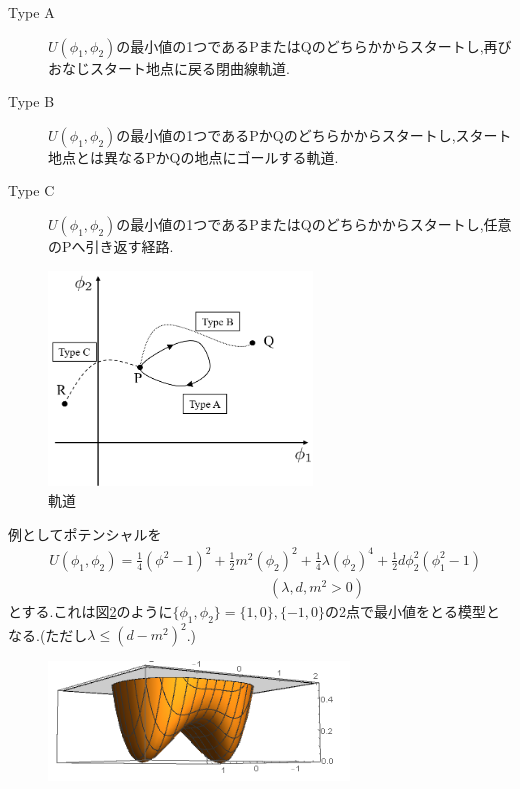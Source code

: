 \documentclass[dvipdfmx,11pt,a4paper,oneside,openany]{jsbook}
\begin{document}
\begin{description}
    \item[Type A] $U(\phi_1,\phi_2)$の最小値の1つであるPまたはQのどちらかからスタートし,再びおなじスタート地点に戻る閉曲線軌道.
    \item[Type B] $U(\phi_1,\phi_2)$の最小値の1つであるPかQのどちらかからスタートし,スタート地点とは異なるPかQの地点にゴールする軌道.
    \item[Type C] $U(\phi_1,\phi_2)$の最小値の1つであるPまたはQのどちらかからスタートし,任意のPへ引き返す経路.
\end{description}

\begin{figure}[H]
    \centering
    \includegraphics[width=7cm]{figure/orbit1.png}
    \caption{軌道}
    \label{orbit1}
\end{figure}

例としてポテンシャルを
\begin{align}
     & U\left(\phi_{1}, \phi_{2}\right)=\frac{1}{4}\left(\phi^{2}-1\right)^{2}+\frac{1}{2} m^{2}\left(\phi_{2}\right)^{2}+\frac{1}{4} \lambda\left(\phi_{2}\right)^{4}+\frac{1}{2} d \phi_{2}^{2}\left(\phi_{1}^{2}-1\right)\label{eq:2.42} \\
     & \qquad \ \ \ \ \ \ \ \ \ \ \ \ \ \ \ \ \ \ \ \ \ \ \ \ \ \ \ \ \ \ \ \ \ \ \ \ \ \ \ \ \ \ \ \ \ \ \ \ \ \ \ \ \ \ \ \ \ \ \ \ \ \ (\lambda, d, m^2 >0)\nonumber
\end{align}
とする.これは図\ref{phi4_model}のように$\{\phi_1,\phi_2\}=\{1,0\},\{-1,0\}$の2点で最小値をとる模型となる.(ただし$\lambda \leq (d-m^2)^2$.)

\begin{figure}[H]
    \centering
    \includegraphics[width=8cm]{figure/phi4_model.png}
    \caption{}
    \label{phi4_model}
\end{figure}
\end{document}
